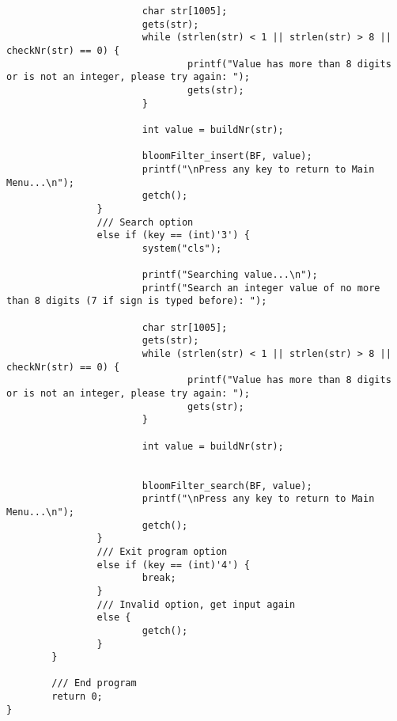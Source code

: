 \documentclass[14pt]{article}
\begin{document}
\begin{lstlisting}
                        char str[1005];
                        gets(str);
                        while (strlen(str) < 1 || strlen(str) > 8 || checkNr(str) == 0) {
                                printf("Value has more than 8 digits or is not an integer, please try again: ");
                                gets(str);
                        }

                        int value = buildNr(str);

                        bloomFilter_insert(BF, value);
                        printf("\nPress any key to return to Main Menu...\n");
                        getch();
                }
                /// Search option
                else if (key == (int)'3') {
                        system("cls");

                        printf("Searching value...\n");
                        printf("Search an integer value of no more than 8 digits (7 if sign is typed before): ");

                        char str[1005];
                        gets(str);
                        while (strlen(str) < 1 || strlen(str) > 8 || checkNr(str) == 0) {
                                printf("Value has more than 8 digits or is not an integer, please try again: ");
                                gets(str);
                        }

                        int value = buildNr(str);


                        bloomFilter_search(BF, value);
                        printf("\nPress any key to return to Main Menu...\n");
                        getch();
                }
                /// Exit program option
                else if (key == (int)'4') {
                        break;
                }
                /// Invalid option, get input again
                else {
                        getch();
                }
        }

        /// End program
        return 0;
}


\end{lstlisting}

\newpage
\end{document}
